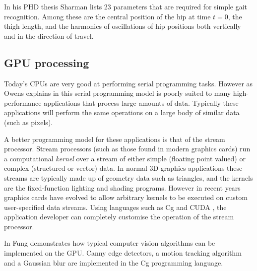 \bigskip
\noindent In his PHD thesis \cite{KarlSharman} Sharman lists 23 parameters that are required for simple gait recognition.
Among these are the central position of the hip at time $t = 0$, the thigh length, and the harmonics of oscillations of hip positions both vertically and in the direction of travel.


\subsection{GPU processing}

Today's CPUs are very good at performing serial programming tasks.
However as Owens explains in \cite{GemsStreams} this serial programming model is poorly suited to many high-performance applications that process large amounts of data.
Typically these applications will perform the same operations on a large body of similar data (such as pixels).

A better programming model for these applications is that of the stream processor.
Stream processors (such as those found in modern graphics cards) run a computational \emph{kernel} over a stream of either simple (floating point valued) or complex (structured or vector) data.
In normal 3D graphics applications these streams are typically made up of geometry data such as triangles, and the kernels are the fixed-function lighting and shading programs.
However in recent years graphics cards have evolved to allow arbitrary kernels to be executed on custom user-specified data streams.
Using languages such as Cg \cite{CgToolkit} and CUDA \cite{CudaToolkit}, the application developer can completely customise the operation of the stream processor.

\bigskip
\noindent In \cite{GemsVision} Fung demonstrates how typical computer vision algorithms can be implemented on the GPU.
Canny edge detectors, a motion tracking algorithm and a Gaussian blur are implemented in the Cg programming language.